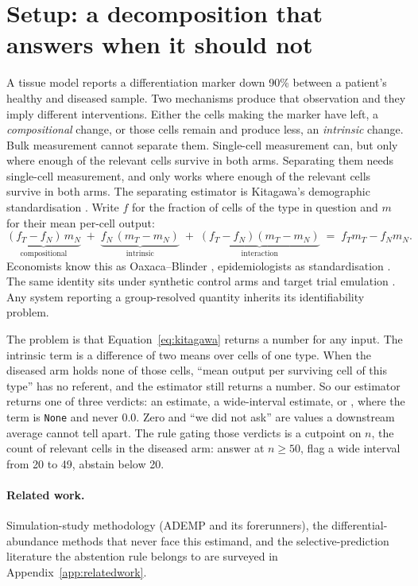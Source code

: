 \section{Setup: a decomposition that answers when it should not}
\label{sec:intro}

A tissue model reports a differentiation marker down 90\% between a patient's
healthy and diseased sample. Two mechanisms produce that observation and they
imply different interventions. Either the cells making the marker have left, a
\emph{compositional} change, or those cells remain and produce less, an
\emph{intrinsic} change.
\iffull
Bulk measurement cannot separate them. Single-cell
measurement can, but only where enough of the relevant cells survive in both
arms.
\else
Separating them needs single-cell measurement, and only works where enough of
the relevant cells survive in both arms.
\fi
The separating estimator is Kitagawa's demographic standardisation
\citep{kitagawa1955}. Write $f$ for the fraction of cells of the type in
question and $m$ for their mean per-cell output:
\begin{equation}
\underbrace{(f_T - f_N)\, m_N}_{\text{compositional}} \;+\;
\underbrace{f_N\, (m_T - m_N)}_{\text{intrinsic}} \;+\;
\underbrace{(f_T - f_N)(m_T - m_N)}_{\text{interaction}}
\;=\; f_T m_T - f_N m_N .
\label{eq:kitagawa}
\end{equation}
Economists know this as Oaxaca--Blinder \citep{oaxaca1973,blinder1973},
epidemiologists as standardisation \citep{kline2011}. The same identity sits
under synthetic control arms \citep{abadie2010} and target trial emulation
\citep{hernan2016}. Any system reporting a group-resolved quantity inherits its
identifiability problem.

The problem is that Equation~\ref{eq:kitagawa} returns a number for any input.
The intrinsic term is a difference of two means over cells of one type. When the
diseased arm holds none of those cells, ``mean output per surviving cell of this
type'' has no referent, and the estimator still returns a number. So our
estimator returns one of three verdicts: an estimate, a wide-interval estimate,
or \notest{}, where the term is \texttt{None} and never $0.0$. Zero and ``we did
not ask'' are values a downstream average cannot tell apart. The rule gating
those verdicts is a cutpoint on $n$, the count of relevant cells in the diseased
arm: answer at $n \geq 50$, flag a wide interval from 20 to 49, abstain below 20.

\iffull
\paragraph{Related work.} Simulation-study methodology (ADEMP and its
forerunners), the differential-abundance methods that never face this
estimand, and the selective-prediction literature the abstention rule belongs
to are surveyed in Appendix~\ref{app:relatedwork}.

